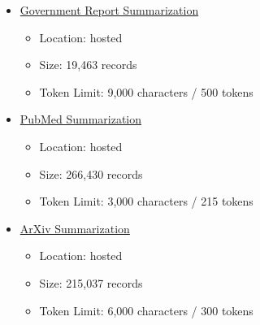 \begin{itemize}
    \item \href{https://huggingface.co/datasets/ccdv/govreport-summarization?row=2}{Government Report Summarization}
    \begin{itemize}
        \item Location: hosted
        \item Size: 19,463 records
        \item Token Limit:  9,000 characters /  500 tokens
    \end{itemize}
    
    \item \href{https://huggingface.co/datasets/ccdv/pubmed-summarization?row=3}{PubMed Summarization}
    \begin{itemize}
        \item Location: hosted
        \item Size: 266,430 records
        \item Token Limit:  3,000 characters /  215 tokens
    \end{itemize}
    
    \item \href{https://huggingface.co/datasets/ccdv/arxiv-summarization}{ArXiv Summarization}
    \begin{itemize}
        \item Location: hosted
        \item Size: 215,037 records
        \item Token Limit:  6,000 characters /  300 tokens
    \end{itemize}
\end{itemize}
